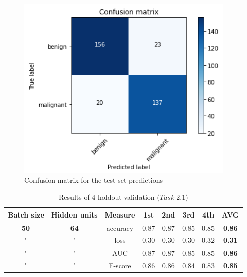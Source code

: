 \documentclass[11pt,a4paper,oneside]{article}
\begin{document}
\begin{figure}[ht]
\begin{minipage}[c]{.4\textwidth}
		\includegraphics[width=.9\textwidth]{images/2.1-da/da_matrix}
		\caption{Confusion matrix for the test-set predictions}
		\label{fig:scratch_matrix_da}
	\end{minipage}%
\end{figure}

\begin{table}[h]
\centering
\begin{tabular}{|cccccccc|}
\hline
Batch size & Hidden units & Measure & 1st & 2nd & 3rd & 4th & \textbf{AVG} \\
\hline
\textbf{50} & \textbf{64} & accuracy & 0.87 & 0.87 & 0.85 & 0.85 & \textbf{0.86} \\
" & " & loss & 0.30 & 0.30 & 0.30 & 0.32 & \textbf{0.31} \\
" & " & AUC & 0.87 & 0.87 & 0.85 & 0.85 & \textbf{0.86} \\
" & " & F-score & 0.86 & 0.86 & 0.84 & 0.83 & \textbf{0.85} \\
\hline
\end{tabular}
\caption{Results of 4-holdout validation ($Task\ 2.1$)}
\end{table}
\end{document}
